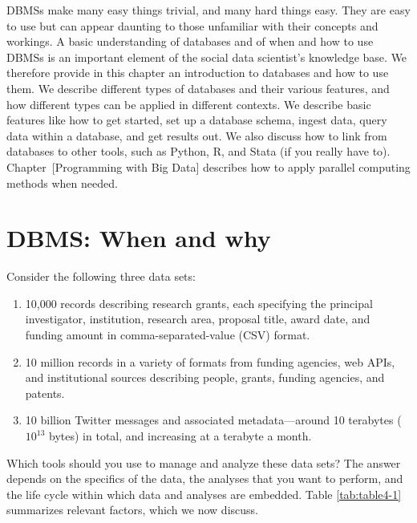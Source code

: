 \documentclass[]{krantz}
\begin{document}
DBMSs make many easy things trivial, and many hard things easy. They are
easy to use but can appear daunting to those unfamiliar with their
concepts and workings. A basic understanding of databases and of when
and how to use DBMSs is an important element of the social data
scientist's knowledge base. We therefore provide in this chapter an
introduction to databases and how to use them. We describe different
types of databases and their various features, and how different types
can be applied in different contexts. We describe basic features like
how to get started, set up a database schema, ingest data, query data
within a database, and get results out. We also discuss how to link from
databases to other tools, such as Python, R, and Stata (if you really
have to). Chapter~{[}Programming with Big Data{]} describes how to apply
parallel computing methods when needed.

\hypertarget{sec:db:when}{\section{DBMS: When and
why}\label{sec:db:when}}

Consider the following three data sets:

\begin{enumerate}
\def\labelenumi{\arabic{enumi}.}
\item
  10,000 records describing research grants, each specifying the
  principal investigator, institution, research area, proposal title,
  award date, and funding amount in comma-separated-value (CSV) format.
\item
  10 million records in a variety of formats from funding agencies, web
  APIs, and institutional sources describing people, grants, funding
  agencies, and patents.
\item
  10 billion Twitter messages and associated metadata---around 10
  terabytes (\(10^{13}\) bytes) in total, and increasing at a terabyte a
  month.
\end{enumerate}

Which tools should you use to manage and analyze these data sets? The
answer depends on the specifics of the data, the analyses that you want
to perform, and the life cycle within which data and analyses are
embedded. Table \ref{tab:table4-1} summarizes relevant factors, which we
now discuss.
\end{document}
